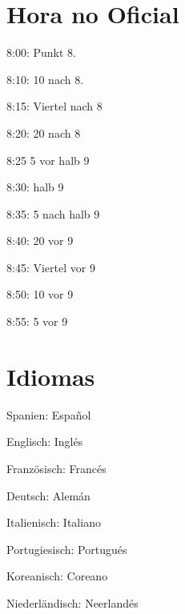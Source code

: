 \section{Hora no Oficial}
\begin{multicols}{3}
\begin{myitemize}
\item 8:00: Punkt 8.
\item 8:10: 10 nach 8.
\item 8:15: Viertel nach 8
\item 8:20: 20 nach 8
\item 8:25 5 vor halb 9
\item 8:30: halb 9
\item 8:35: 5 nach halb 9
\item 8:40: 20 vor 9
\item 8:45: Viertel vor 9
\item 8:50: 10 vor 9
\item 8:55: 5 vor 9
\end{myitemize}
\end{multicols}



\section{Idiomas}
\begin{multicols}{3}
\begin{myitemize}
\item Spanien: Español
\item Englisch: Inglés
\item Französisch: Francés
\item Deutsch: Alemán
\item Italienisch: Italiano
\item Portugiesisch: Portugués
\item Koreanisch: Coreano
\item Niederländisch: Neerlandés
\end{myitemize}
\end{multicols}

